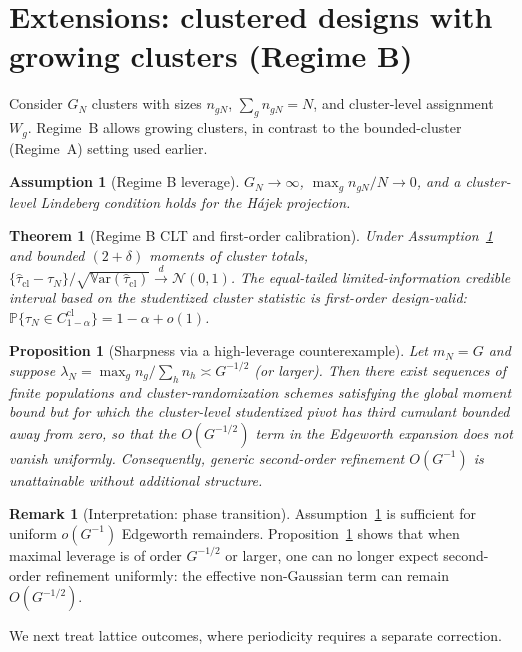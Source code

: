 \documentclass[aos]{imsart}
\newtheorem{theorem}{Theorem}
\newtheorem{proposition}{Proposition}
\newtheorem{assumption}{Assumption}
\theoremstyle{definition}
\newtheorem{remark}{Remark}
\theoremstyle{plain}
\newcommand{\Var}{\mathbb{V}\mathrm{ar}}
\newcommand{\Prb}{\mathbb{P}}
\begin{document}
\section{Extensions: clustered designs with growing clusters (Regime B)}\label{sec:clusterB}
Consider $G_N$ clusters with sizes $n_{gN}$, $\sum_g n_{gN}=N$, and cluster-level assignment $W_g$.
Regime~B allows growing clusters, in contrast to the bounded-cluster (Regime~A) setting used earlier.
\begin{assumption}[Regime B leverage]\label{ass:regimeB}
$G_N\to\infty$, $\max_g n_{gN}/N\to0$, and a cluster-level Lindeberg condition holds for the Hájek projection.
\end{assumption}
\begin{theorem}[Regime B CLT and first-order calibration]\label{thm:clusterB}
Under Assumption~\ref{ass:regimeB} and bounded $(2+\delta)$ moments of cluster totals,
$\{\hat\tau_{\mathrm{cl}}-\tau_N\}/\sqrt{\Var(\hat\tau_{\mathrm{cl}})}\overset{d}{\to}\mathcal{N}(0,1)$.
The equal-tailed limited-information credible interval based on the studentized cluster statistic is first-order
design-valid: $\Prb\{\tau_N\in C^{\mathrm{cl}}_{1-\alpha}\}=1-\alpha+o(1)$.
\end{theorem}


\begin{proposition}[Sharpness via a high-leverage counterexample]\label{prop:lev_counter}
Let $m_N=G$ and suppose $\lambda_N=\max_g n_g/\sum_h n_h \asymp G^{-1/2}$ (or larger). Then there exist sequences of finite populations and cluster-randomization schemes satisfying the global moment bound but for which the cluster-level studentized pivot has third cumulant bounded away from zero, so that the $O(G^{-1/2})$ term in the Edgeworth expansion does \emph{not} vanish uniformly. Consequently, generic second-order refinement $O(G^{-1})$ is unattainable without additional structure.
\end{proposition}

\begin{remark}[Interpretation: phase transition]\label{rem:phase}
Assumption~\ref{ass:regimeB} is sufficient for uniform $o(G^{-1})$ Edgeworth remainders. Proposition~\ref{prop:lev_counter} shows that when maximal leverage is of order $G^{-1/2}$ or larger, one can no longer expect second-order refinement uniformly: the effective non-Gaussian term can remain $O(G^{-1/2})$.
\end{remark}
We next treat lattice outcomes, where periodicity requires a separate correction.
\end{document}
